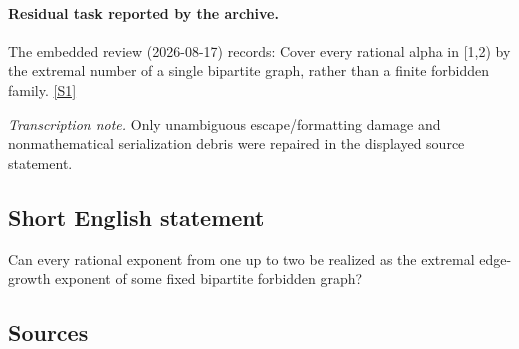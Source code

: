\documentclass[11pt,a4paper]{article}
\newcommand{\sref}[2]{\hyperlink{source:#1:#2}{[S#2]}}
\begin{document}
\paragraph{Residual task reported by the archive.}

The embedded review (2026-08-17) records: Cover every rational alpha in [1,2) by the extremal number of a single bipartite graph, rather than a finite forbidden family. \sref{statement}{1}

{\small\emph{Transcription note.} Only unambiguous escape/formatting damage and nonmathematical serialization debris were repaired in the displayed source statement.}

\subsection{Short English statement}

Can every rational exponent from one up to two be realized as the extremal edge-growth exponent of some fixed bipartite forbidden graph?

\subsection{Sources}
\end{document}
